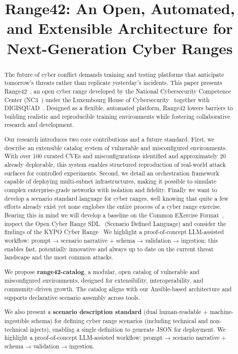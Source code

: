 \documentclass[11pt]{article}
\title{Range42: An Open, Automated, and Extensible Architecture for Next-Generation Cyber Ranges}
\author{} %
\date{}   %
\begin{document}
\maketitle

\begin{abstract}
The future of cyber conflict demands training and testing platforms that anticipate tomorrow’s threats rather than replicate yesterday’s incidents. This paper presents Range42~\cite{range42}, an open cyber range developed by the National Cybersecurity Competence Center (NC3~\cite{NC3}) under the Luxembourg House of Cybersecurity~\cite{LHC} together with DIGISQUAD~\cite{DIGISQUAD}. Designed as a flexible, automated platform, Range42 lowers barriers to building realistic and reproducible training environments while fostering collaborative research and development.

Our research introduces two core contributions and a future standard. First, we describe an extensible catalog system of vulnerable and misconfigured environments. With over 100 curated CVEs and misconfigurations identified and approximately 20 already deployable, this system enables structured reproduction of real-world attack surfaces for controlled experiments. Second, we detail an orchestration framework capable of deploying multi-subnet infrastructures, making it possible to simulate complex enterprise-grade networks with isolation and fidelity. Finally we want to develop a scenario standard language for cyber ranges, well knowing that quite a few efforts already exist yet none englobes the entire process of a cyber range exercise. Bearing this in mind we will develop a baseline on the Common EXercise Format~\cite{cexf}, inspect the Open Cyber Range SDL~\cite{SDL} (Scenario Defined Language) and consider the findings of the KYPO Cyber Range~\cite{kypo2020} We highlight a proof-of-concept LLM-assisted workflow: prompt → scenario narrative + schema → validation → ingestion; this enables fast, potentially innovative and always up to date on the current threat landscape and the most common attacks.

We propose \textbf{range42-catalog}, a modular, open catalog of vulnerable and misconfigured environments, designed for extensibility, interoperability, and community-driven growth. The catalog aligns with our Ansible-based architecture and supports declarative scenario assembly across tools.

We also present a \textbf{scenario description standard} (dual human-readable + machine-ingestible schema) for defining cyber range scenarios (including technical and non-technical injects), enabling a single definition to generate JSON for deployment. We highlight a proof-of-concept LLM-assisted workflow: prompt → scenario narrative + schema → validation → ingestion.


\end{abstract}
\end{document}
